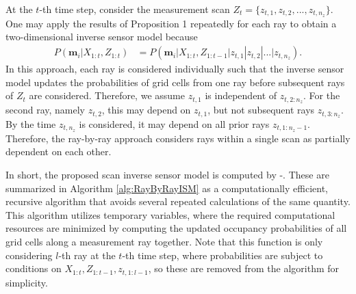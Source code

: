 At the $t$-th time step, consider the measurement scan $Z_t=\{z_{t,1},z_{t,2},...,z_{t,n_z}\}$. One may apply the results of Proposition 1 repeatedly for each ray to obtain a two-dimensional inverse sensor model because
\begin{align}
\label{eqn:RayByRayScanISM}
P(\mathbf{m}_i|X_{1:t},Z_{1:t})&%
=P(\mathbf{m}_i|X_{1:t},Z_{1:t-1}|z_{t,1}|z_{t,2}|...|z_{t,n_z}).
\end{align}
In this approach, each ray is considered individually such that the inverse sensor model updates the probabilities of grid cells from one ray before subsequent rays of $Z_t$ are considered. Therefore, we assume $z_{t,1}$ is independent of $z_{t,2:n_z}$. For the second ray, namely $z_{t,2}$, this may depend on $z_{t,1}$, but not subsequent rays $z_{t,3:n_z}$. By the time $z_{t,n_z}$ is considered, it may depend on all prior rays $z_{t,1:n_z-1}$. Therefore, the ray-by-ray approach considers rays within a single scan as partially dependent on each other.

In short, the proposed scan inverse sensor model is computed by -. These are summarized in Algorithm \ref{alg:RayByRayISM} as a computationally efficient, recursive algorithm that avoids several repeated calculations of the same quantity. This algorithm utilizes temporary variables, where the required computational resources are minimized by computing the updated occupancy probabilities of all grid cells along a measurement ray together. Note that this function is only considering $l$-th ray at the $t$-th time step, where probabilities are subject to conditions on $X_{1:t},Z_{1:t-1},z_{t,1:l-1}$, so these are removed from the algorithm for simplicity.

